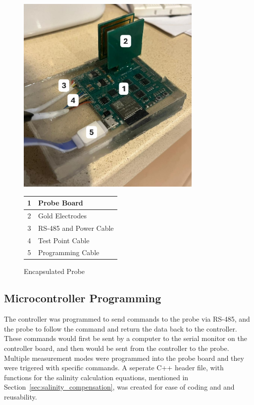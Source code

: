 \begin{figure}[H]
    \begin{minipage}{0.5\textwidth}
        \centering
        \includegraphics[width=0.8\textwidth]{Figures/encapsulated_probe.jpg}
    \end{minipage}
    \begin{minipage}{0.5\textwidth}
        \centering
        \begin{tabular}{cl} \hline
            1 & Probe Board \\ \hline
            2 & Gold Electrodes \\ \hline
            3 & RS-485 and Power Cable \\ \hline
            4 & Test Point Cable \\ \hline
            5 & Programming Cable \\ \hline
        \end{tabular}
    \end{minipage}
    \caption{Encapsulated Probe}
    \label{fig:encapsulated_probe} %
\end{figure}

\subsection{Microcontroller Programming}
The controller was programmed to send commands to the probe via RS-485, and the probe to follow the command and return the data back to the controller.
These commands would first be sent by a computer to the serial monitor on the controller board, and then would be sent from the controller to the probe.
Multiple measurement modes were programmed into the probe board and they were trigered with specific commands.
A seperate C++ header file, with functions for the salinity calculation equations, mentioned in Section~\ref{sec:salinity_compensation}, was created for ease of coding and and reusability.

